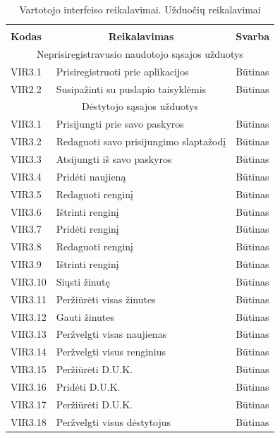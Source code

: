 \documentclass{VUMIFPSkursinis}
\begin{document}
\begin{longtable}{|p{2cm}|p{}|p{2cm}|}\toprule
\caption{Vartotojo interfeiso reikalavimai. Užduočių reikalavimai}\\
\hline  \rowcolor{lightgray} 
\multicolumn{3}{|c|}{2. Užduočių reikalavimai}\\ \hline 
\multicolumn{1}{|l|}{\textbf{Kodas}} & \multicolumn{1}{c|}{\textbf{Reikalavimas}} & \multicolumn{1}{c|}{\textbf{Svarba}} \\ \hline 
\multicolumn{3}{|c|}{Neprisiregistravusio naudotojo sąsajos užduotys}\\ \hline
{VIR3.1}&{Prisiregistruoti prie aplikacijos}&{Būtinas} \\ \hline
{VIR2.2}&{Susipažinti su puslapio taisyklėmis}&{Būtinas}\\ \hline
\multicolumn{3}{|c|}{Dėstytojo sąsajos užduotys}\\ \hline
{VIR3.1}&{Prisijungti prie savo paskyros}&{Būtinas}\\ \hline
{VIR3.2}&{Redaguoti savo prisijungimo slaptažodį}&{Būtinas}\\ \hline
{VIR3.3}&{Atsijungti iš savo paskyros}&{Būtinas}\\ \hline
{VIR3.4}&{Pridėti naujieną}&{Būtinas}\\ 	\hline
{VIR3.5}&{Redaguoti renginį}&{Būtinas}\\	\hline
{VIR3.6}&{Ištrinti renginį}&{Būtinas}\\ 	\hline
{VIR3.7}&{Pridėti renginį}&{Būtinas}\\ 	\hline
{VIR3.8}&{Redaguoti renginį}&{Būtinas}\\ 	\hline
{VIR3.9}&{Ištrinti renginį}&{Būtinas}\\	\hline
{VIR3.10}&{Siųsti žinutę}&{Būtinas}\\ 	\hline
{VIR3.11}&{Peržiūrėti visas žinutes}&{Būtinas}\\ 	\hline
{VIR3.12}&{Gauti žinutes}&{Būtinas}\\ 	\hline
{VIR3.13}&{Peržvelgti visas naujienas}&{Būtinas}\\	\hline
{VIR3.14}&{Peržvelgti visus renginius}&{Būtinas}\\	\hline
{VIR3.15}&{Peržiūrėti D.U.K.}&{Būtinas}\\	\hline
{VIR3.16}&{Pridėti D.U.K.}&{Būtinas}\\ 	\hline
{VIR3.17}&{Peržiūrėti D.U.K.}&{Būtinas}\\	\hline
{VIR3.18}&{Peržvelgti visus dėstytojus}&{Būtinas}\\ 	\hline

\end{longtable}
\end{document}
